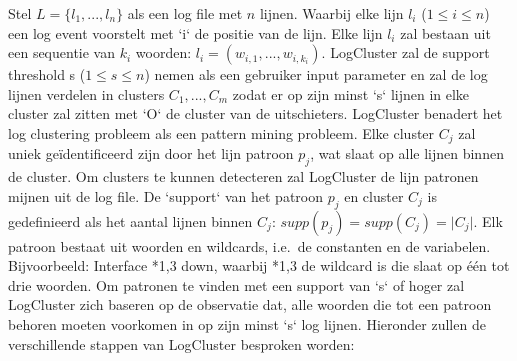 Stel \(L = \{l_{1}, ..., l_{n}\}\) als een log file met $n$ lijnen. Waarbij elke lijn \(l_{i}\) (\(1 \leq i \leq n\)) een log event voorstelt met `i` de positie van de lijn. Elke lijn \(l_{i}\) zal bestaan uit een sequentie van \(k_{i}\) woorden: \(l_{i} = (w_{i, 1}, ..., w_{i, k_{i}})\). LogCluster zal de support threshold s (\(1 \leq s \leq n\)) nemen als een gebruiker input parameter en zal de log lijnen verdelen in clusters \(C_{1}, ..., C_{m}\) zodat er op zijn minst `s` lijnen in elke cluster zal zitten met `O` de cluster van de uitschieters. LogCluster benadert het log clustering probleem als een pattern mining probleem. Elke cluster \(C_{j}\) zal uniek geïdentificeerd zijn door het lijn patroon \(p_{j}\), wat slaat op alle lijnen binnen de cluster. Om clusters te kunnen detecteren zal LogCluster de lijn patronen mijnen uit de log file. De `support` van het patroon \(p_{j}\) en cluster \(C_{j}\) is gedefinieerd als het aantal lijnen binnen \(C_{j}\): \(supp(p_{j}) = supp(C_{j}) = \lvert C_{j} \rvert\). Elk patroon bestaat uit woorden en wildcards, i.e.\ de constanten en de variabelen. Bijvoorbeeld: Interface *{1,3} down, waarbij *{1,3} de wildcard is die slaat op één tot drie woorden. Om patronen te vinden met een support van `s` of hoger zal LogCluster zich baseren op de observatie dat, alle woorden die tot een patroon behoren moeten voorkomen in op zijn minst `s` log lijnen. Hieronder zullen de verschillende stappen van LogCluster besproken worden:

